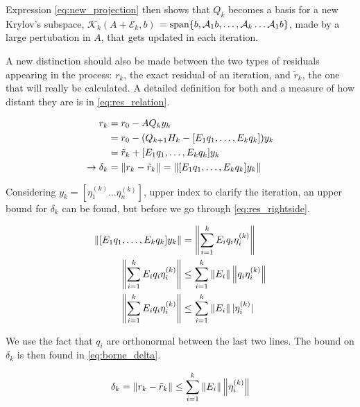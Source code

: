 Expression \ref{eq:new_projection} then shows that $Q_{k}$ becomes a basis for a new Krylov's subspace, $\mathcal{K}_{k}(A+\mathcal{E}_{k},b)$ $= \operatorname{span} \{b,\mathcal{A}_{1}b,\dots, \mathcal{A}_{k}\dots\mathcal{A}_{1}b \}$, made by a large pertubation in $A$, that gets updated in each iteration.

A new distinction should also be made between the two types of residuals appearing in the process: $r_{k}$, the exact residual of an iteration, and $\tilde{r}_{k}$, the one that will really be calculated. A detailed definition for both and a measure of how distant they are is in \ref{eq:res_relation}.

\begin{align}\label{eq:res_relation}
    \begin{split}
        r_{k} &= r_{0} - AQ_{k}y_{k}\\
        &= r_{0} - (Q_{k+1}H_{k} - [E_{1}q_{1},\dots , E_{k}q_{k}])y_{k}\\
        &= \tilde{r}_{k} +[E_{1}q_{1},\dots , E_{k}q_{k}]y_{k}\\
        \rightarrow \delta_{k} &= \left\lVert r_{k} - \tilde{r}_{k}\right\rVert  = \left\lVert[E_{1}q_{1},\dots , E_{k}q_{k}]y_{k}\right\rVert
    \end{split}
\end{align}

Considering $y_{k} = [\eta_{1}^{(k)} \dots \eta_{n}^{(k)} ] $, upper index to clarify the iteration, an upper bound for $\delta_{k}$ can be found, but before we go through \ref{eq:res_rightside}.

\begin{align}\label{eq:res_rightside}
    \begin{split}
        \left\lVert[E_{1}q_{1},\dots , E_{k}q_{k}]y_{k}\right\rVert & = \left\lVert\sum_{i=1}^{k}E_{i}q_{i}\eta^{(k)}_{i}\right\rVert\\
        \left\lVert\sum_{i=1}^{k}E_{i}q_{i}\eta^{(k)}_{i}\right\rVert & \leq \sum_{i=1}^{k}\left\lVert E_{i}\right\rVert\left\lVert q_{i}\eta^{(k)}_{i}\right\rVert\\
        \left\lVert\sum_{i=1}^{k}E_{i}q_{i}\eta^{(k)}_{i}\right\rVert & \leq \sum_{i=1}^{k}\left\lVert E_{i}\right\rVert|\eta^{(k)}_{i}|
    \end{split}
\end{align}

We use the fact that $q_{i}$ are orthonormal between the last two lines. The bound on $\delta_{k}$ is then found in \ref{eq:borne_delta}.


\begin{equation}\label{eq:borne_delta}
    \delta_{k} = \left\lVert r_{k} - \tilde{r}_{k}\right\rVert \leq \sum_{i=1}^{k} \left\lVert E_{i}\right\rVert \left\lVert\eta_{i}^{(k)}\right\rVert
\end{equation}


